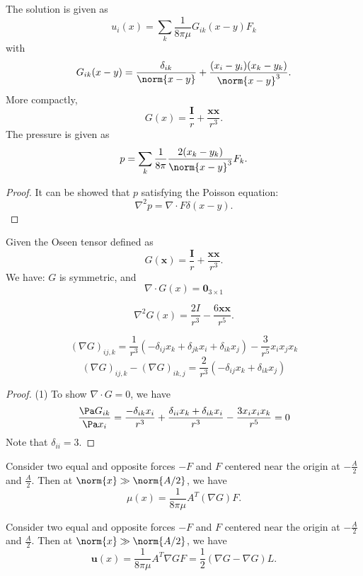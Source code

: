 \begin{refsection}
\begin{theorem}
	The solution is given as
	$$u_i(x) = \sum_k \frac{1}{8\pi\mu} G_{ik}(x-y) F_k$$
	with 
	$$G_{ik}(x-y) = \frac{\delta_{ik}}{\norm{x-y}} + \frac{(x_i - y_i)(x_k - y_k)}{\norm{x-y}^3}.$$
More compactly, $$G(x) = \frac{\bm{I}}{r} + \frac{\bm{xx}}{r^3}.$$	
	The pressure is given as	
	$$p = \sum_k \frac{1}{8\pi} \frac{2(x_k-y_k)}{\norm{x-y}^3} F_k.$$
\end{theorem}
\begin{proof}
	It can be showed that $p$ satisfying the Poisson equation:
	$$\nabla^2  p = \nabla \cdot F \delta(x-y).$$ 
\end{proof}


\begin{lemma}\cite[130]{barthes2012microhydrodynamics}\cite[50]{kim2013microhydrodynamics}\label{ch:microhydrodynamics:th:OseenTensorProperties}
Given the Oseen tensor defined as
	$$G(\bm{x}) = \frac{\bm{I}}{r} + \frac{\bm{xx}}{r^3}.$$
We have: $G$ is symmetric, and	
	$$\nabla\cdot G(x) = \bm{0}_{3\times 1}$$

	$$\nabla^2 G(x) = \frac{2I}{r^3} - \frac{6\bm{xx}}{r^5}.$$
	
	$$(\nabla G)_{ij,k} = \frac{1}{r^3}(-\delta_{ij}x_k + \delta_{jk}x_i + \delta_{ik}x_j) - \frac{3}{r^5}x_ix_jx_k$$
	$$(\nabla G)_{ij,k} - (\nabla G)_{ik,j} = \frac{2}{r^3}(-\delta_{ij}x_k  + \delta_{ik}x_j) $$
\end{lemma}
\begin{proof}
(1) To show $\nabla\cdot G = 0$, we have
\begin{align*}
\frac{\Pa G_{ik}}{\Pa x_i} = \frac{-\delta_{ik}x_i}{r^3} + \frac{\delta_{ii}x_k + \delta_{ik}x_i}{r^3} - \frac{3 x_ix_ix_k}{r^5}  = 0
\end{align*}
Note that $\delta_{ii}=3$.
\end{proof}



\begin{lemma}\cite[133]{barthes2012microhydrodynamics}
Consider two equal and opposite forces $-F$ and $F$ centered near the origin at $-\frac{A}{2}$ and $\frac{A}{2}$. Then at $\norm{x}\gg \norm{A/2}$, we have
$$\mu(x) = \frac{1}{8\pi \mu} A^T (\nabla G) F.$$
\end{lemma}


\begin{lemma}\cite[133]{barthes2012microhydrodynamics}
	Consider two equal and opposite forces $-F$ and $F$ centered near the origin at $-\frac{A}{2}$ and $\frac{A}{2}$. Then at $\norm{x}\gg \norm{A/2}$, we have
	$$\bm{u}(x) = \frac{1}{8\pi \mu} A^T \nabla G F = \frac{1}{2}(\nabla G - \nabla G) L.$$
\end{lemma}


\end{refsection}

